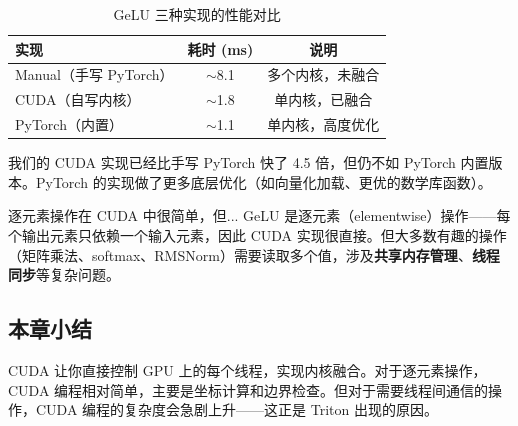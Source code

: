 \begin{table}[H]
\centering
\begin{tabular}{lcc}
\toprule
\textbf{实现} & \textbf{耗时 (ms)} & \textbf{说明} \\
\midrule
Manual（手写 PyTorch） & $\sim$8.1 & 多个内核，未融合 \\
CUDA（自写内核） & $\sim$1.8 & 单内核，已融合 \\
PyTorch（内置） & $\sim$1.1 & 单内核，高度优化 \\
\bottomrule
\end{tabular}
\caption{GeLU 三种实现的性能对比}
\end{table}

我们的 CUDA 实现已经比手写 PyTorch 快了 4.5 倍，但仍不如 PyTorch 内置版本。PyTorch 的实现做了更多底层优化（如向量化加载、更优的数学库函数）。

\begin{warningbox}{逐元素操作在 CUDA 中很简单，但...}
GeLU 是逐元素（elementwise）操作——每个输出元素只依赖一个输入元素，因此 CUDA 实现很直接。但大多数有趣的操作（矩阵乘法、softmax、RMSNorm）需要读取多个值，涉及\textbf{共享内存管理}、\textbf{线程同步}等复杂问题。
\end{warningbox}

\subsection{本章小结}

CUDA 让你直接控制 GPU 上的每个线程，实现内核融合。对于逐元素操作，CUDA 编程相对简单，主要是坐标计算和边界检查。但对于需要线程间通信的操作，CUDA 编程的复杂度会急剧上升——这正是 Triton 出现的原因。


